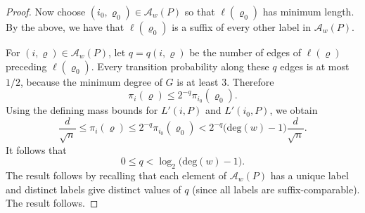 \documentclass[10pt,a4paper]{amsart}
\def\deg{\mathrm{deg}}
\let\rho=\varrho
\begin{document}
\begin{proof}
Now choose $(i_0,\rho_0)\in\mathcal A_w(P)$ so that
$\ell(\rho_0)$ has minimum length. By the above, we have that $\ell(\rho_0)$ is a suffix of every other label
in $\mathcal A_w(P)$.

For $(i,\rho)\in\mathcal A_w(P)$, let $q=q(i,\rho)$ be the
number of edges of $\ell(\rho)$ preceding 
$\ell(\rho_0)$. Every transition probability along these $q$ edges
is at most $1/2$, because the minimum degree of $G$ is at least $3$.
Therefore
\[
\pi_i(\rho)
\le
2^{-q}\pi_{i_0}(\rho_0).
\]
Using the defining mass bounds for $L'(i,P)$ and
$L'(i_0,P)$, we obtain
\[
\frac{d}{\sqrt n}
\le
\pi_i(\rho)
\le
2^{-q}\pi_{i_0}(\rho_0)
<
2^{-q}\bigl(\deg(w)-1\bigr)\frac{d}{\sqrt n}.
\]
It follows that
\[
0\le q<
\log_2\bigl(\deg(w)-1\bigr).
\]
The result follows by recalling that each element of $\mathcal{A}_w(P)$ has a unique label and distinct labels give distinct values of $q$ (since all labels are suffix-comparable). The result follows. 
\end{proof}
\end{document}

